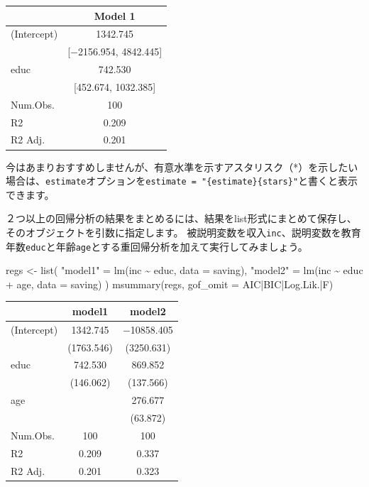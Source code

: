\documentclass[
]{book}
\newenvironment{Shaded}{\begin{snugshade}}{\end{snugshade}}
\newcommand{\AttributeTok}[1]{\textcolor[rgb]{0.77,0.63,0.00}{#1}}
\newcommand{\FunctionTok}[1]{\textcolor[rgb]{0.00,0.00,0.00}{#1}}
\newcommand{\NormalTok}[1]{#1}
\newcommand{\OtherTok}[1]{\textcolor[rgb]{0.56,0.35,0.01}{#1}}
\newcommand{\SpecialCharTok}[1]{\textcolor[rgb]{0.00,0.00,0.00}{#1}}
\newcommand{\StringTok}[1]{\textcolor[rgb]{0.31,0.60,0.02}{#1}}
\begin{document}
\begin{table}
\centering
\begin{tabular}[t]{lc}
\toprule
  & Model 1\\
\midrule
(Intercept) & \num{1342.745}\\
 & {}[\num{-2156.954}, \num{4842.445}]\\
educ & \num{742.530}\\
 & {}[\num{452.674}, \num{1032.385}]\\
\midrule
Num.Obs. & \num{100}\\
R2 & \num{0.209}\\
R2 Adj. & \num{0.201}\\
\bottomrule
\end{tabular}
\end{table}

今はあまりおすすめしませんが、有意水準を示すアスタリスク（*）を示したい場合は、\texttt{estimate}オプションを\texttt{estimate\ =\ "\{estimate\}\{stars\}"}と書くと表示できます。

２つ以上の回帰分析の結果をまとめるには、結果をlist形式にまとめて保存し、そのオブジェクトを引数に指定します。
被説明変数を収入\texttt{inc}、説明変数を教育年数\texttt{educ}と年齢\texttt{age}とする重回帰分析を加えて実行してみましょう。

\begin{Shaded}
\begin{Highlighting}[]
\NormalTok{regs }\OtherTok{\textless{}{-}}
  \FunctionTok{list}\NormalTok{(}
    \StringTok{"model1"} \OtherTok{=} \FunctionTok{lm}\NormalTok{(inc }\SpecialCharTok{\textasciitilde{}}\NormalTok{ educ, }\AttributeTok{data =}\NormalTok{ saving),}
    \StringTok{"model2"} \OtherTok{=} \FunctionTok{lm}\NormalTok{(inc }\SpecialCharTok{\textasciitilde{}}\NormalTok{ educ }\SpecialCharTok{+}\NormalTok{ age, }\AttributeTok{data =}\NormalTok{ saving)}
\NormalTok{  )}
\FunctionTok{msummary}\NormalTok{(regs, }\AttributeTok{gof\_omit =} \StringTok{\textquotesingle{}AIC|BIC|Log.Lik.|F\textquotesingle{}}\NormalTok{)}
\end{Highlighting}
\end{Shaded}

\begin{table}
\centering
\begin{tabular}[t]{lcc}
\toprule
  & model1 & model2\\
\midrule
(Intercept) & \num{1342.745} & \num{-10858.405}\\
 & (\num{1763.546}) & (\num{3250.631})\\
educ & \num{742.530} & \num{869.852}\\
 & (\num{146.062}) & (\num{137.566})\\
age &  & \num{276.677}\\
 &  & (\num{63.872})\\
\midrule
Num.Obs. & \num{100} & \num{100}\\
R2 & \num{0.209} & \num{0.337}\\
R2 Adj. & \num{0.201} & \num{0.323}\\
\bottomrule
\end{tabular}
\end{table}
\end{document}

